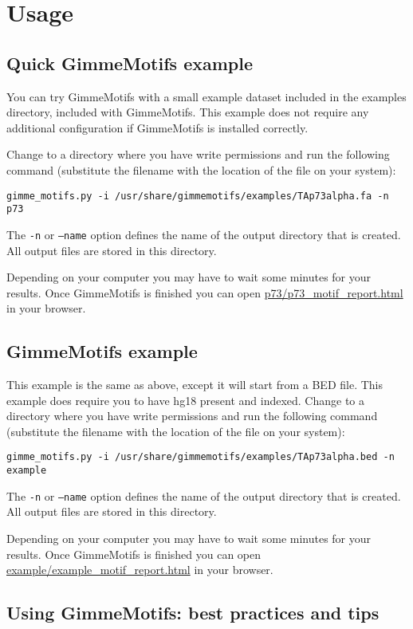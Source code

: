 \documentclass[11pt]{article}
\begin{document}
\section{Usage}
\subsection{Quick GimmeMotifs example}
\label{sec:quick_example}
You can try GimmeMotifs with a small example dataset included in the examples directory, included with GimmeMotifs. This example does not require any additional configuration if GimmeMotifs is installed correctly.

Change to a directory where you have write permissions and run the following command (substitute the filename with the location of the file on your system):
\begin{verbatim}
gimme_motifs.py -i /usr/share/gimmemotifs/examples/TAp73alpha.fa -n p73
\end{verbatim}

The \texttt{-n} or \texttt{--name} option defines the name of the output directory that is created. All output files are stored in this directory.

Depending on your computer you may have to wait some minutes for your results. Once GimmeMotifs is finished you can open \url{p73/p73_motif_report.html} in your browser. 

\subsection{GimmeMotifs example}
This example is the same as above, except it will start from a BED file. This example does require you to have hg18 present and indexed. 
Change to a directory where you have write permissions and run the following command (substitute the filename with the location of the file on your system):
\begin{verbatim}
gimme_motifs.py -i /usr/share/gimmemotifs/examples/TAp73alpha.bed -n example
\end{verbatim}

The \texttt{-n} or \texttt{--name} option defines the name of the output directory that is created. All output files are stored in this directory.

Depending on your computer you may have to wait some minutes for your results. Once GimmeMotifs is finished you can open \url{example/example_motif_report.html} in your browser. 

\subsection{Using GimmeMotifs: best practices and tips}
\end{document}
